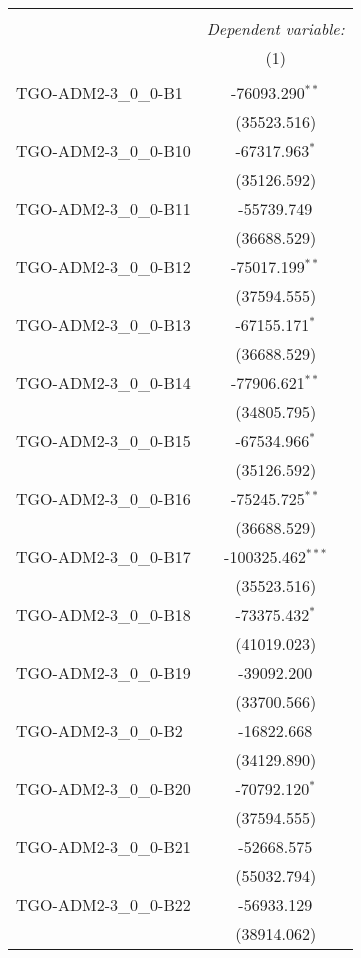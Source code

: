 \begin{table}[!htbp] \centering
\begin{tabular}{@{\extracolsep{5pt}}lc}
\\[-1.8ex]\hline
\hline \\[-1.8ex]
& \multicolumn{1}{c}{\textit{Dependent variable:}} \
\cr \cline{1-2}
\\[-1.8ex] & (1) \\
\hline \\[-1.8ex]
 TGO-ADM2-3_0_0-B1 & -76093.290$^{**}$ \\
  & (35523.516) \\
 TGO-ADM2-3_0_0-B10 & -67317.963$^{*}$ \\
  & (35126.592) \\
 TGO-ADM2-3_0_0-B11 & -55739.749$^{}$ \\
  & (36688.529) \\
 TGO-ADM2-3_0_0-B12 & -75017.199$^{**}$ \\
  & (37594.555) \\
 TGO-ADM2-3_0_0-B13 & -67155.171$^{*}$ \\
  & (36688.529) \\
 TGO-ADM2-3_0_0-B14 & -77906.621$^{**}$ \\
  & (34805.795) \\
 TGO-ADM2-3_0_0-B15 & -67534.966$^{*}$ \\
  & (35126.592) \\
 TGO-ADM2-3_0_0-B16 & -75245.725$^{**}$ \\
  & (36688.529) \\
 TGO-ADM2-3_0_0-B17 & -100325.462$^{***}$ \\
  & (35523.516) \\
 TGO-ADM2-3_0_0-B18 & -73375.432$^{*}$ \\
  & (41019.023) \\
 TGO-ADM2-3_0_0-B19 & -39092.200$^{}$ \\
  & (33700.566) \\
 TGO-ADM2-3_0_0-B2 & -16822.668$^{}$ \\
  & (34129.890) \\
 TGO-ADM2-3_0_0-B20 & -70792.120$^{*}$ \\
  & (37594.555) \\
 TGO-ADM2-3_0_0-B21 & -52668.575$^{}$ \\
  & (55032.794) \\
 TGO-ADM2-3_0_0-B22 & -56933.129$^{}$ \\
  & (38914.062) \\

\end{tabular}
\end{table}
